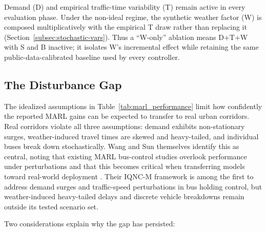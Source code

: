 Demand (D) and empirical traffic-time variability (T) remain active in every evaluation phase. Under the non-ideal regime, the synthetic weather factor (W) is composed multiplicatively with the empirical T draw rather than replacing it (Section~\ref{subsec:stochastic-vars}). Thus a ``W-only'' ablation means D+T+W with S and B inactive; it isolates W's incremental effect while retaining the same public-data-calibrated baseline used by every controller.



\subsection{The Disturbance Gap}
\label{subsec:disturbance-gap}
The idealized assumptions in Table~\ref{tab:marl_performance} limit how confidently the reported MARL gains can be expected to transfer to real urban corridors. Real corridors violate all three assumptions: demand exhibits non-stationary surges, weather-induced travel times are skewed and heavy-tailed, and individual buses break down stochastically. Wang and Sun themselves identify this as central, noting that existing MARL bus-control studies overlook performance under perturbations and that this becomes critical when transferring models toward real-world deployment \cite{Wangsun}. Their IQNC-M framework is among the first to address demand surges and traffic-speed perturbations in bus holding control, but weather-induced heavy-tailed delays and discrete vehicle breakdowns remain outside its tested scenario set.

Two considerations explain why the gap has persisted:

